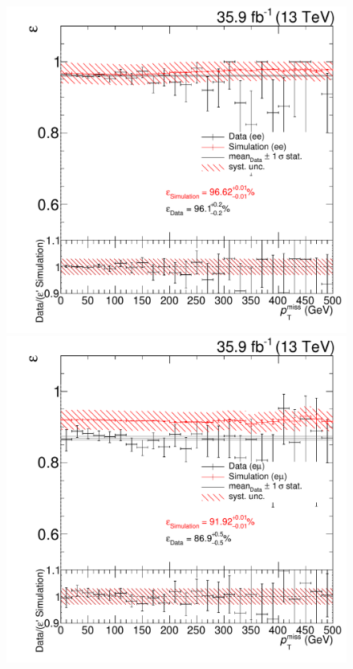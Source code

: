\begin{figure}[htb]
 \centering
 \includegraphics[width=\pairwidth]{figures/triggerStudies/efficiency_dataHT_trigDilep_ptcuts_EE_met}
 \includegraphics[width=\pairwidth]{figures/triggerStudies/efficiency_dataHT_trigDilep_ptcuts_EM_met}

\end{figure}
